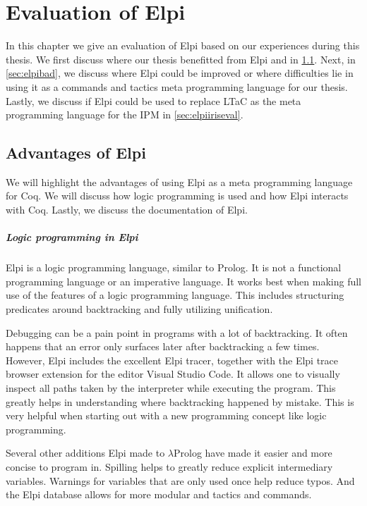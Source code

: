 \documentclass[thesis.tex]{subfiles}
\begin{document}
\VerbatimFootnotes

\chapter{Evaluation of Elpi} \label{ch:evalelpi}
In this chapter we give an evaluation of Elpi based on our experiences during this thesis. We first discuss where our thesis benefitted from Elpi and \ce in \cref{sec:elpigood}. Next, in \cref{sec:elpibad}, we discuss where Elpi could be improved or where difficulties lie in using it as a commands and tactics meta programming language for our thesis. Lastly, we discuss if Elpi could be used to replace LTaC as the meta programming language for the IPM in \cref{sec:elpiiriseval}.

\section{Advantages of Elpi}\label{sec:elpigood}
We will highlight the advantages of using Elpi as a meta programming language for Coq. We will discuss how logic programming is used and how Elpi interacts with Coq. Lastly, we discuss the documentation of Elpi.

\paragraph{Logic programming in Elpi}
Elpi is a logic programming language, similar to Prolog. It is not a functional programming language or an imperative language. It works best when making full use of the features of a logic programming language. This includes structuring predicates around backtracking and fully utilizing unification.

Debugging can be a pain point in programs with a lot of backtracking. It often happens that an error only surfaces later after backtracking a few times. However, Elpi includes the excellent Elpi tracer, together with the Elpi trace browser extension \cite{tassiLPCICElpilang2023} for the editor Visual Studio Code. It allows one to visually inspect all paths taken by the interpreter while executing the program. This greatly helps in understanding where backtracking happened by mistake. This is very helpful when starting out with a new programming concept like logic programming.

Several other additions Elpi made to $\lambda$Prolog have made it easier and more concise to program in. Spilling helps to greatly reduce explicit intermediary variables. Warnings for variables that are only used once help reduce typos. And the Elpi database allows for more modular and tactics and commands.
\end{document}
